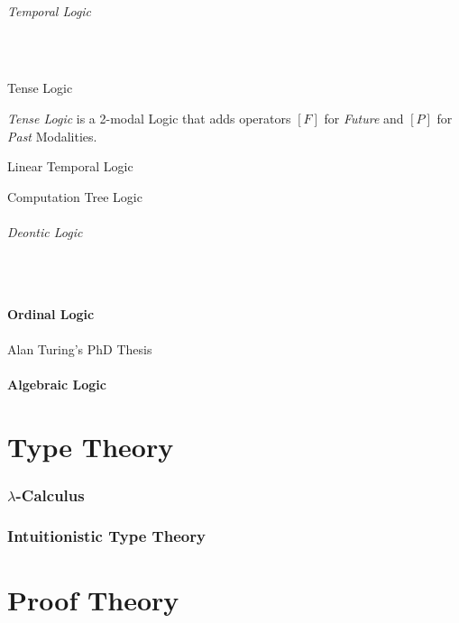 \documentclass{article}
\begin{document}
\paragraph{Temporal Logic} \hfill \\

\subparagraph{Tense Logic}

\emph{Tense Logic} is a 2-modal Logic that adds operators $[F]$ for
\emph{Future} and $[P]$ for \emph{Past} Modalities.

\subparagraph{Linear Temporal Logic}

\subparagraph{Computation Tree Logic}

\paragraph{Deontic Logic} \hfill \\

\subsection{Ordinal Logic}

Alan Turing's PhD Thesis \cite{turing38}

\subsection{Algebraic Logic}

\part{Type Theory}

\section{$\lambda$-Calculus}

\section{Intuitionistic Type Theory}

\part{Proof Theory}
\end{document}
